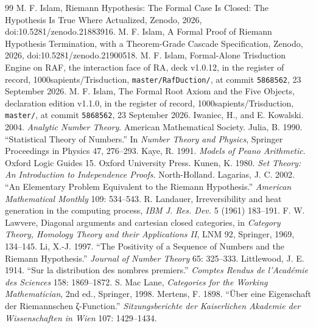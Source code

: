 \documentclass[10pt,twocolumn]{article}
\begin{document}
\begin{thebibliography}{99}
 M. F. Islam, Riemann Hypothesis: The Formal Case Is Closed: The Hypothesis Is True Where Actualized, Zenodo, 2026, doi:10.5281/zenodo.21883916.
 M. F. Islam, A Formal Proof of Riemann Hypothesis Termination, with a Theorem-Grade Cascade Specification, Zenodo, 2026, doi:10.5281/zenodo.21900518.
 M. F. Islam, Formal-Alone Trisduction Engine on RAF, the interaction face of RA, deck v1.0.12, in the register of record, 1000sapients/Trisduction, \texttt{master/RafDuction/}, at commit \texttt{5868562}, 23 September 2026.
 M. F. Islam, The Formal Root Axiom and the Five Objects, declaration edition v1.1.0, in the register of record, 1000sapients/Trisduction, \texttt{master/}, at commit \texttt{5868562}, 23 September 2026.
 Iwaniec, H., and E. Kowalski. 2004. \emph{Analytic Number Theory}. American Mathematical Society.
 Julia, B. 1990. ``Statistical Theory of Numbers.'' In \emph{Number Theory and Physics}, Springer Proceedings in Physics 47, 276--293.
 Kaye, R. 1991. \emph{Models of Peano Arithmetic}. Oxford Logic Guides 15. Oxford University Press.
 Kunen, K. 1980. \emph{Set Theory: An Introduction to Independence Proofs}. North-Holland.
 Lagarias, J. C. 2002. ``An Elementary Problem Equivalent to the Riemann Hypothesis.'' \emph{American Mathematical Monthly} 109: 534--543.
 R. Landauer, Irreversibility and heat generation in the computing process, \emph{IBM J. Res. Dev.} 5 (1961) 183--191.
 F. W. Lawvere, Diagonal arguments and cartesian closed categories, in \emph{Category Theory, Homology Theory and their Applications II}, LNM 92, Springer, 1969, 134--145.
 Li, X.-J. 1997. ``The Positivity of a Sequence of Numbers and the Riemann Hypothesis.'' \emph{Journal of Number Theory} 65: 325--333.
 Littlewood, J. E. 1914. ``Sur la distribution des nombres premiers.'' \emph{Comptes Rendus de l'Académie des Sciences} 158: 1869--1872.
 S. Mac Lane, \emph{Categories for the Working Mathematician}, 2nd ed., Springer, 1998.
 Mertens, F. 1898. ``Über eine Eigenschaft der Riemannschen ζ-Function.'' \emph{Sitzungsberichte der Kaiserlichen Akademie der Wissenschaften in Wien} 107: 1429--1434.

\end{thebibliography}
\end{document}
